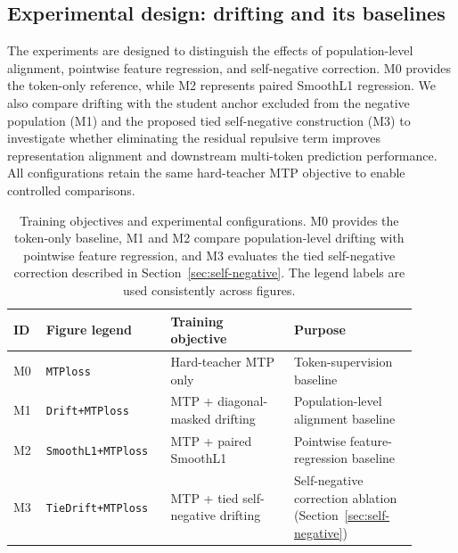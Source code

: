 \documentclass{article}
\begin{document}
\subsection{Experimental design: drifting and its baselines}
\label{sec:comparisons}
The experiments are designed to distinguish the effects of population-level alignment, pointwise feature regression, and self-negative correction. M0 provides the token-only reference, while M2 represents paired SmoothL1 regression. We also compare drifting with the student anchor excluded
from the negative population (M1) and the proposed
tied self-negative construction (M3) to investigate whether eliminating the residual
repulsive term improves representation alignment
and downstream multi-token prediction performance. All configurations retain the same hard-teacher MTP objective to enable controlled comparisons.

\begin{table}[t]
\centering
\caption{Training objectives and experimental configurations.
M0 provides the token-only baseline, M1 and M2 compare
population-level drifting with pointwise feature regression,
and M3 evaluates the tied self-negative correction described
in Section~\ref{sec:self-negative}.
The legend labels are used consistently across figures.}
\label{tab:variants}
\small
\setlength{\tabcolsep}{4pt}
\begin{tabular}{@{}p{0.07\linewidth}
                  p{0.27\linewidth}
                  p{0.28\linewidth}
                  p{0.28\linewidth}@{}}
\toprule
\textbf{ID} &
\textbf{Figure legend} &
\textbf{Training objective} &
\textbf{Purpose}\\
\midrule

M0 &
\texttt{MTPloss} &
Hard-teacher MTP only &
Token-supervision baseline\\

M1 &
\texttt{Drift+MTPloss} &
MTP + diagonal-masked drifting &
Population-level alignment baseline\\

M2 &
\texttt{SmoothL1+MTPloss} &
MTP + paired SmoothL1 &
Pointwise feature-regression baseline\\

M3 &
\texttt{TieDrift+MTPloss} &
MTP + tied self-negative drifting &
Self-negative correction ablation
(Section~\ref{sec:self-negative})\\

\bottomrule
\end{tabular}
\end{table}
\end{document}
